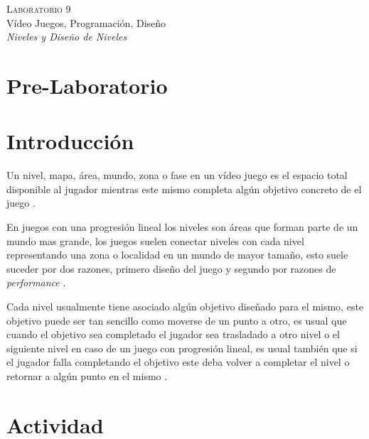 \begin{center}
\textsc{\Large Laboratorio 9}~\\
{\large Vídeo Juegos, Programación, Diseño}~\\
\emph{Niveles y Diseño de Niveles}
\end{center}

\section{Pre-Laboratorio}

\section{Introducción}
Un nivel, mapa, área, mundo, zona o fase en un vídeo juego es el espacio total disponible al jugador  mientras este mismo completa algún objetivo concreto de el juego \cite[p.~107]{bobbatesgamedesign}.

En juegos con una progresión lineal los niveles son áreas que forman parte de un mundo mas grande, los juegos suelen conectar niveles con cada nivel representando una zona o localidad en un mundo de mayor tamaño, esto suele suceder por dos razones, primero diseño del juego y segundo por razones de \emph{performance} \cite[p.~104]{jenkinscreatinggames}.

Cada nivel usualmente tiene asociado algún objetivo diseñado para el mismo, este objetivo puede ser tan sencillo como moverse de un punto a otro, es usual que cuando el objetivo sea completado el jugador sea trasladado a otro nivel o el siguiente nivel en caso de un juego con progresión lineal, es usual también que si el jugador falla completando el objetivo este deba volver a completar el nivel o retornar a algún punto en el mismo \cite[p.~111]{bobbatesgamedesign}.
\section{Actividad}
